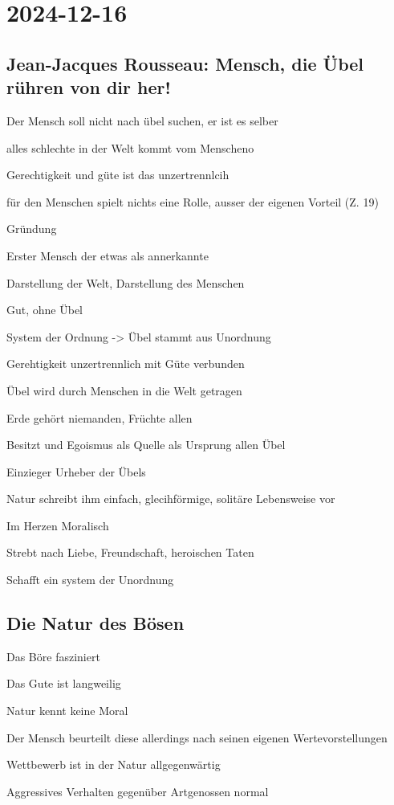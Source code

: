 \section{2024-12-16}

\subsection{Jean-Jacques Rousseau: Mensch, die Übel rühren von dir her!}

\startitemize[packed]
\item Der Mensch soll nicht nach übel suchen, er ist es selber
\item alles schlechte in der Welt kommt vom Menscheno
\item Gerechtigkeit und güte ist das unzertrennlcih
\item für den Menschen spielt nichts eine Rolle, ausser der eigenen Vorteil (Z. 19)
\item Gründung
\startitemize[packed]
\item Erster Mensch der etwas als  annerkannte
\stopitemize
\stopitemize

\startplacetable[location={here},title={}]
\setupTABLE[r][1][background=color,backgroundcolor=gray]
\bTABLE[offset=1mm]
\startCSV
Darstellung der Welt, Darstellung des Menschen
\stopCSV
\bTR
\bTD %
\startitemize[packed]
\item Gut, ohne Übel
\item System der Ordnung -> Übel stammt aus Unordnung
\item Gerehtigkeit unzertrennlich mit Güte verbunden
\item Übel wird durch Menschen in die Welt getragen
\item Erde gehört niemanden, Früchte allen
\item Besitzt und Egoismus als Quelle als Ursprung allen Übel
\stopitemize
\eTD
\bTD %
\startitemize[packed]
\item Einzieger Urheber der Übels
\item Natur schreibt ihm einfach, glecihförmige, solitäre Lebensweise vor
\item Im Herzen Moralisch
\startitemize[packed]
\item Strebt nach Liebe, Freundschaft, heroischen Taten
\stopitemize
\item Schafft ein system der Unordnung
\stopitemize
\eTD
\eTR
\eTABLE
\stopplacetable

\subsection{Die Natur des Bösen}

\startitemize[packed]
\item Das Böre fasziniert
\item Das Gute ist langweilig
\item Natur kennt keine Moral
\item Der Mensch beurteilt diese allerdings nach seinen eigenen Wertevorstellungen
\item Wettbewerb ist in der Natur allgegenwärtig
\item Aggressives Verhalten gegenüber Artgenossen normal
\item 
\stopitemize
